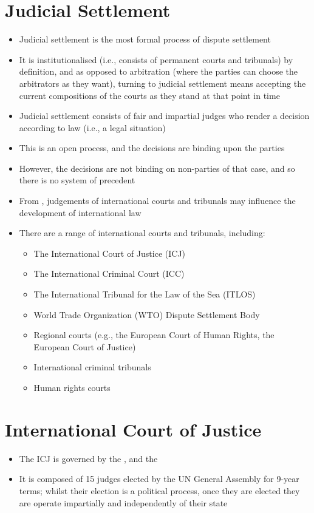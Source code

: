 \section{Judicial Settlement}
\begin{itemize}
    \item Judicial settlement is the most formal process of dispute settlement
    \item It is institutionalised (i.e., consists of permanent courts and tribunals) by definition, and as opposed to arbitration (where the parties can choose the arbitrators as they want), turning to judicial settlement means accepting the current compositions of the courts as they stand at that point in time
    \item Judicial settlement consists of fair and impartial judges who render a decision according to law (i.e., a legal situation)
    \item This is an open process, and the decisions are binding upon the parties
    \item However, the decisions are not binding on non-parties of that case, and so there is no system of precedent
    \item From , judgements of international courts and tribunals may influence the development of international law
    \item There are a range of international courts and tribunals, including:
    \begin{itemize}
        \item The International Court of Justice (ICJ)
        \item The International Criminal Court (ICC)
        \item The International Tribunal for the Law of the Sea (ITLOS)
        \item World Trade Organization (WTO) Dispute Settlement Body
        \item Regional courts (e.g., the European Court of Human Rights, the European Court of Justice)
        \item International criminal tribunals
        \item Human rights courts
    \end{itemize}
\end{itemize}

\section{International Court of Justice}
\begin{itemize}
    \item The ICJ is governed by the , and the 
    \item It is composed of 15 judges elected by the UN General Assembly for 9-year terms; whilst their election is a political process, once they are elected they are operate impartially and independently of their state
\end{itemize}

